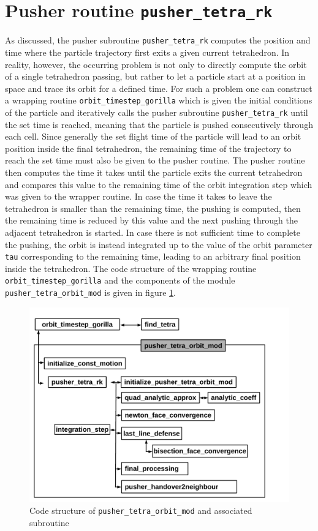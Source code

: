 \documentclass[./main.tex]{subfiles}
\begin{document}
\section{Pusher routine \texttt{pusher\_tetra\_rk}}
\label{sec:NumericalPusher}
As discussed, the pusher subroutine \texttt{pusher\_tetra\_rk} computes the position and time where the particle trajectory first exits a given current tetrahedron. In reality, however, the occurring problem is not only to directly compute the orbit of a single tetrahedron passing, but rather to let a particle start at a position in space and trace its orbit for a defined time. For such a problem one can construct a wrapping routine \texttt{orbit\_timestep\_gorilla} which is given the initial conditions of the particle and iteratively calls the pusher subroutine \texttt{pusher\_tetra\_rk} until the set time is reached, meaning that the particle is pushed consecutively through each cell. Since generally the set flight time of the particle will lead to an orbit position inside the final tetrahedron, the remaining time of the trajectory to reach the set time must also be given to the pusher routine. The pusher routine then computes the time it takes until the particle exits the current tetrahedron and compares this value to the remaining time of the orbit integration step which was given to the wrapper routine. In case the time it takes to leave the tetrahedron is smaller than the remaining time, the pushing is computed, then the remaining time is reduced by this value and the next pushing through the adjacent tetrahedron is started. In case there is not sufficient time to complete the pushing, the orbit is instead integrated up to the value of the orbit parameter \texttt{tau} corresponding to the remaining time, leading to an arbitrary final position inside the tetrahedron. The code structure of the wrapping routine \texttt{orbit\_timestep\_gorilla} and the components of the module \texttt{pusher\_tetra\_orbit\_mod} is given in figure \ref{fig:Codestructure_Pusher_tetra_orbit}. 

\begin{figure}[h!]
	\includegraphics[width=1\textwidth]{figures/pusher_tetra_orbit.pdf}
	\caption{Code structure of \texttt{pusher\_tetra\_orbit\_mod} and associated subroutine}
	\label{fig:Codestructure_Pusher_tetra_orbit}
\end{figure}
\end{document}
